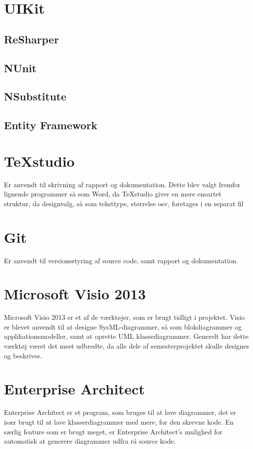 \section{UIKit}

\subsection*{ReSharper} %

\subsection*{NUnit}

\subsection*{NSubstitute}

\subsection*{Entity Framework}

\section*{TeXstudio}
Er anvendt til skrivning af rapport og dokumentation. Dette blev valgt fremfor lignende programmer så som Word, da TeXstudio giver en mere ensartet struktur, da designvalg, så som teksttype, størrelse osv, foretages i en separat fil

\section*{Git}
Er anvendt til versionsstyring af source code, samt rapport og dokumentation.

\section*{Microsoft Visio 2013}
Microsoft Visio 2013 er et af de værktøjer, som er brugt tidligt i projektet. Visio er blevet anvendt til at designe SysML-diagrammer, så som blokdiagrammer og applikationsmodeller, samt at oprette UML klassediagrammer. Generelt har dette værktøj været det mest udbredte, da alle dele af semesterprojektet skulle designes og beskrives.

\section*{Enterprise Architect}
Enterprise Architect er et program, som bruges til at lave diagrammer, det er især brugt til at lave klasserdiagrammer med mere, for den skrevne kode. En særlig feature som er brugt meget, er Enterprise Architect's mulighed for automatisk at generere diagrammer udfra rå source kode.

